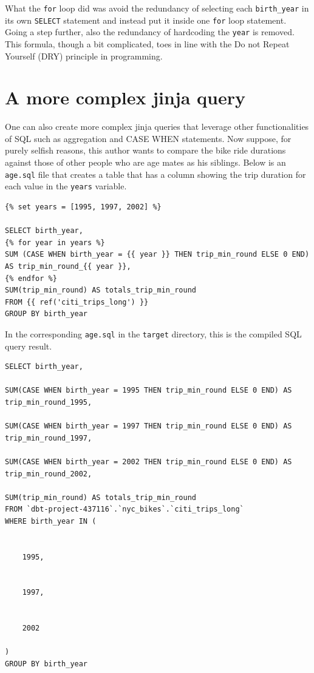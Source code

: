 \documentclass[
]{book}
\begin{document}
What the \texttt{for} loop did was avoid the redundancy of selecting each \texttt{birth\_year} in its own \texttt{SELECT} statement and instead put it inside one \texttt{for} loop statement. Going a step further, also the redundancy of hardcoding the \texttt{year} is removed. This formula, though a bit complicated, toes in line with the Do not Repeat Yourself (DRY) principle in programming.

\hypertarget{a-more-complex-jinja-query}{%
\section{A more complex jinja query}\label{a-more-complex-jinja-query}}

One can also create more complex jinja queries that leverage other functionalities of SQL such as aggregation and CASE WHEN statements. Now suppose, for purely selfish reasons, this author wants to compare the bike ride durations against those of other people who are age mates as his siblings. Below is an \texttt{age.sql} file that creates a table that has a column showing the trip duration for each value in the \texttt{years} variable.

\begin{verbatim}
{% set years = [1995, 1997, 2002] %}

SELECT birth_year, 
{% for year in years %}
SUM (CASE WHEN birth_year = {{ year }} THEN trip_min_round ELSE 0 END) AS trip_min_round_{{ year }},
{% endfor %}
SUM(trip_min_round) AS totals_trip_min_round
FROM {{ ref('citi_trips_long') }}
GROUP BY birth_year
\end{verbatim}

In the corresponding \texttt{age.sql} in the \texttt{target} directory, this is the compiled SQL query result.

\begin{verbatim}
SELECT birth_year, 

SUM(CASE WHEN birth_year = 1995 THEN trip_min_round ELSE 0 END) AS trip_min_round_1995,

SUM(CASE WHEN birth_year = 1997 THEN trip_min_round ELSE 0 END) AS trip_min_round_1997,

SUM(CASE WHEN birth_year = 2002 THEN trip_min_round ELSE 0 END) AS trip_min_round_2002,

SUM(trip_min_round) AS totals_trip_min_round
FROM `dbt-project-437116`.`nyc_bikes`.`citi_trips_long`
WHERE birth_year IN (
  
  
    1995, 
  
  
    1997, 
  
  
    2002
  
)
GROUP BY birth_year
\end{verbatim}
\end{document}
